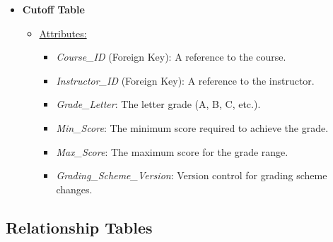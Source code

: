 \documentclass[12pt]{article}
\begin{document}
\begin{itemize}
    \item \textbf{Cutoff Table}
    \begin{itemize}
        \item \underline{Attributes:}
        \begin{itemize}
            \item \textit{Course\_ID} (Foreign Key): A reference to the course.
            \item \textit{Instructor\_ID} (Foreign Key): A reference to the instructor.
            \item \textit{Grade\_Letter}: The letter grade (A, B, C, etc.).
            \item \textit{Min\_Score}: The minimum score required to achieve the grade.
            \item \textit{Max\_Score}: The maximum score for the grade range.
            \item \textit{Grading\_Scheme\_Version}: Version control for grading scheme changes.
        \end{itemize}
    \end{itemize}
\end{itemize}

\subsection*{Relationship Tables}
\end{document}

